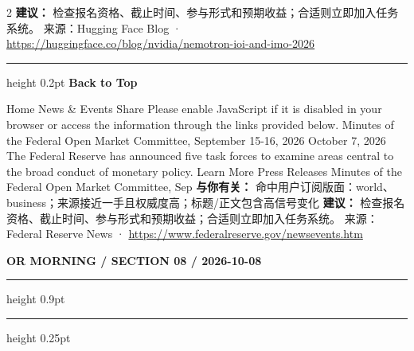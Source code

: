 \documentclass[10.5pt]{ctexart}
\begin{document}
\begin{multicols}{2}
\textbf{建议：} 检查报名资格、截止时间、参与形式和预期收益；合适则立即加入任务系统。
{\footnotesize\color{ormuted} 来源：Hugging Face Blog · \url{https://huggingface.co/blog/nvidia/nemotron-ioi-and-imo-2026}}
\vspace{2mm}
\hrule height 0.2pt
\vspace{2mm}
{\large\bfseries Back to Top}\par
Home News \& Events Share Please enable JavaScript if it is disabled in your browser or access the information through the links provided below. Minutes of the Federal Open Market Committee, September 15-16, 2026 October 7, 2026 The Federal Reserve has announced five task forces to examine areas central to the broad conduct of monetary policy. Learn More Press Releases Minutes of the Federal Open Market Committee, Sep
\textbf{与你有关：} 命中用户订阅版面：world、business；来源接近一手且权威度高；标题/正文包含高信号变化
\textbf{建议：} 检查报名资格、截止时间、参与形式和预期收益；合适则立即加入任务系统。
{\footnotesize\color{ormuted} 来源：Federal Reserve News · \url{https://www.federalreserve.gov/newsevents.htm}}
\end{multicols}
\newpage
{\small\bfseries OR MORNING / SECTION 08 / 2026-10-08}
\vspace{2mm}
\hrule height 0.9pt
\vspace{1.5mm}
\hrule height 0.25pt
\vspace{4mm}
\end{document}

